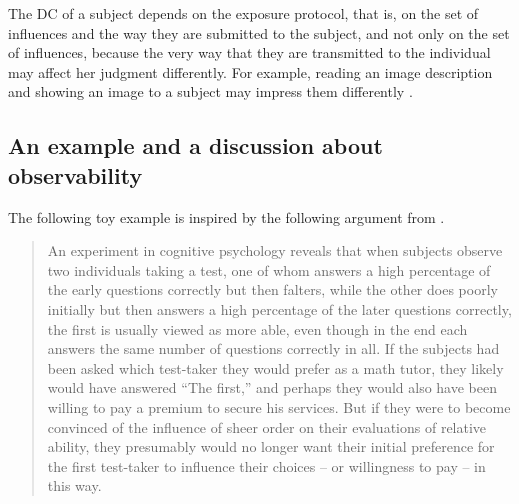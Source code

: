 \documentclass[version=last, pagesize, twoside=off, bibliography=totoc, fontsize=12pt, a4paper, french, english]{scrartcl}
\begin{document}
The \ac{DC} of a subject depends on the exposure protocol, that is, on the set of influences and the way they are submitted to the subject, and not only on the set of influences, because the very way that they are transmitted to the individual may affect her judgment differently. For example, reading an image description and showing an image to a subject may impress them differently \citep{railton_facts_2003}.

\subsection{An example and a discussion about observability}
The following toy example is inspired by the following argument from \citet[p.~59]{railton_facts_2003}.
\begin{quote}
  An experiment in cognitive psychology reveals that when subjects observe two individuals taking a test, one of whom answers a high percentage of the early questions correctly but then falters, while the other does
  poorly initially but then answers a high percentage of the later questions
  correctly, the first is usually viewed as more able, even though in the end
  each answers the same number of questions correctly in all. If the subjects had been asked which test-taker they would prefer as a math tutor,
  they likely would have answered “The first,” and perhaps they would also
  have been willing to pay a premium to secure his services. But if they
  were to become convinced of the influence of sheer order on their evaluations of relative ability, they presumably would no longer want their
  initial preference for the first test-taker to influence their choices – or
  willingness to pay – in this way.
\end{quote}
\end{document}
